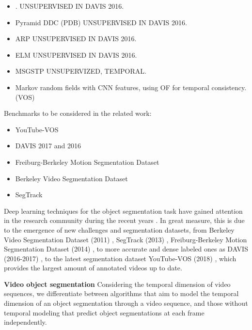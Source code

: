 \documentclass[10pt,twocolumn,letterpaper]{article}
\begin{document}
\begin{itemize}
    \item \cite{tokmakov2017learning_motion}. UNSUPERVISED IN DAVIS 2016. 
    \item Pyramid DDC (PDB) \cite{song2018pyramid} UNSUPERVISED IN DAVIS 2016. 
    \item ARP \cite{koh2017primary} UNSUPERVISED IN DAVIS 2016.
    \item ELM \cite{lao2018extending} UNSUPERVISED IN DAVIS 2016.
    \item MSGSTP \cite{hu2018unsupervised} UNSUPERVIZED, TEMPORAL.
    \item \cite{bao2018cnn} Markov random fields with CNN features, using OF for temporal consistency. (VOS)
    
\end{itemize}

Benchmarks to be considered in the related work:
\begin{itemize}
    \item YouTube-VOS \cite{xu2018youtube}
    \item DAVIS 2017 and 2016 \cite{Pont-Tuset_arXiv_2017} \cite{Perazzi2016}
    \item Freiburg-Berkeley Motion Segmentation Dataset \cite{ochs2014segmentation}
    \item Berkeley Video Segmentation Dataset \cite{amfm_pami2011}
    \item SegTrack \cite{li2013video}
    
\end{itemize}
\fi
Deep learning techniques for the object segmentation task have gained attention in the research community during the recent years \cite{caelles2017one, voigtlaender2017online, perazzi2017learning, yang2018efficient, cheng2017segflow, jampani2017video, tokmakov2017learning, hu2017maskrnn, song2018pyramid, koh2017primary, tokmakov2017learning_motion, jain2017fusionseg, lao2018extending, hu2018unsupervised, xingjian2015convolutional, Salvador17}. In great measure, this is due to the emergence of new challenges and segmentation datasets, from Berkeley Video Segmentation Dataset (2011) \cite{amfm_pami2011}, SegTrack (2013) \cite{li2013video}, Freiburg-Berkeley Motion Segmentation Dataset (2014) \cite{ochs2014segmentation}, to more accurate and dense labeled ones as DAVIS (2016-2017) \cite{Perazzi2016, Pont-Tuset_arXiv_2017}, to the latest segmentation dataset YouTube-VOS (2018) \cite{xu2018youtube}, which provides the largest amount of annotated videos up to date.

\textbf{Video object segmentation}
Considering the temporal dimension of video sequences, we differentiate between algorithms that aim to model the temporal dimension of an object segmentation through a video sequence, and those without temporal modeling that predict object segmentations at each frame independently. 
\end{document}
